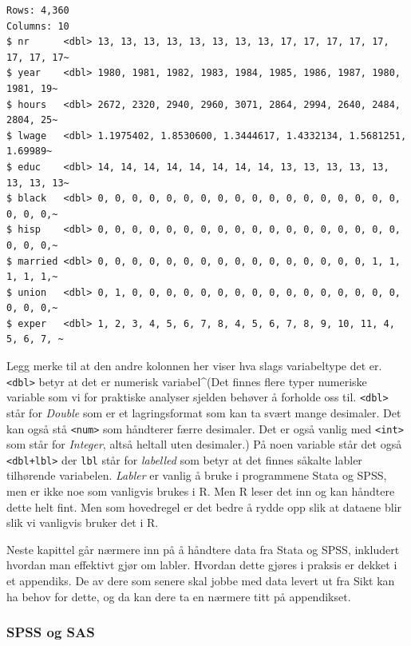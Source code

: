 \documentclass[
  norsk,
  letterpaper,
  DIV=11,
  numbers=noendperiod]{scrreprt}
\theoremstyle{definition}
\theoremstyle{remark}
\begin{document}
\begin{verbatim}
Rows: 4,360
Columns: 10
$ nr      <dbl> 13, 13, 13, 13, 13, 13, 13, 13, 17, 17, 17, 17, 17, 17, 17, 17~
$ year    <dbl> 1980, 1981, 1982, 1983, 1984, 1985, 1986, 1987, 1980, 1981, 19~
$ hours   <dbl> 2672, 2320, 2940, 2960, 3071, 2864, 2994, 2640, 2484, 2804, 25~
$ lwage   <dbl> 1.1975402, 1.8530600, 1.3444617, 1.4332134, 1.5681251, 1.69989~
$ educ    <dbl> 14, 14, 14, 14, 14, 14, 14, 14, 13, 13, 13, 13, 13, 13, 13, 13~
$ black   <dbl> 0, 0, 0, 0, 0, 0, 0, 0, 0, 0, 0, 0, 0, 0, 0, 0, 0, 0, 0, 0, 0,~
$ hisp    <dbl> 0, 0, 0, 0, 0, 0, 0, 0, 0, 0, 0, 0, 0, 0, 0, 0, 0, 0, 0, 0, 0,~
$ married <dbl> 0, 0, 0, 0, 0, 0, 0, 0, 0, 0, 0, 0, 0, 0, 0, 0, 1, 1, 1, 1, 1,~
$ union   <dbl> 0, 1, 0, 0, 0, 0, 0, 0, 0, 0, 0, 0, 0, 0, 0, 0, 0, 0, 0, 0, 0,~
$ exper   <dbl> 1, 2, 3, 4, 5, 6, 7, 8, 4, 5, 6, 7, 8, 9, 10, 11, 4, 5, 6, 7, ~
\end{verbatim}

Legg merke til at den andre kolonnen her viser hva slags variabeltype
det er. \texttt{\textless{}dbl\textgreater{}} betyr at det er numerisk
variabel\^{}(Det finnes flere typer numeriske variable som vi for
praktiske analyser sjelden behøver å forholde oss til.
\texttt{\textless{}dbl\textgreater{}} står for \emph{Double} som er et
lagringsformat som kan ta svært mange desimaler. Det kan også stå
\texttt{\textless{}num\textgreater{}} som håndterer færre desimaler. Det
er også vanlig med \texttt{\textless{}int\textgreater{}} som står for
\emph{Integer}, altså heltall uten desimaler.) På noen variable står det
også \texttt{\textless{}dbl+lbl\textgreater{}} der \texttt{lbl} står for
\emph{labelled} som betyr at det finnes såkalte labler tilhørende
variabelen. \emph{Labler} er vanlig å bruke i programmene Stata og SPSS,
men er ikke noe som vanligvis brukes i R. Men R leser det inn og kan
håndtere dette helt fint. Men som hovedregel er det bedre å rydde opp
slik at dataene blir slik vi vanligvis bruker det i R.

Neste kapittel går nærmere inn på å håndtere data fra Stata og SPSS,
inkludert hvordan man effektivt gjør om labler. Hvordan dette gjøres i
praksis er dekket i et appendiks. De av dere som senere skal jobbe med
data levert ut fra Sikt kan ha behov for dette, og da kan dere ta en
nærmere titt på appendikset.

\subsubsection{SPSS og SAS}\label{spss-og-sas}
\end{document}
